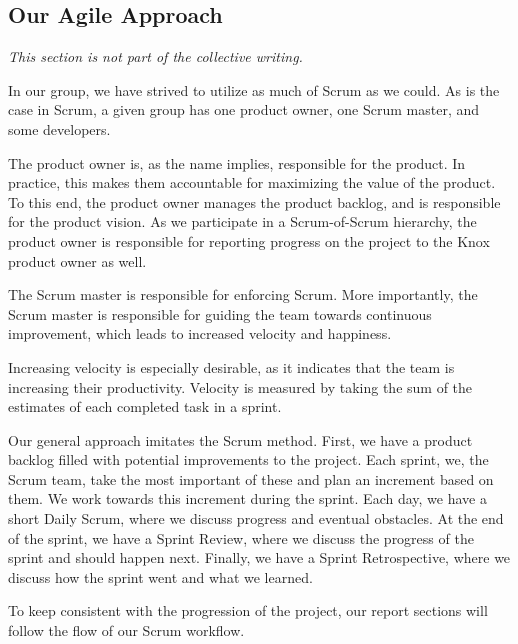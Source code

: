 \subsection{Our Agile Approach}\label{our_agile_approach}
\textit{This section is not part of the collective writing.}

In our group, we have strived to utilize as much of Scrum as we could.
As is the case in Scrum, a given group has one product owner, one Scrum master, and some developers.

The product owner is, as the name implies, responsible for the product. In practice, this makes them accountable for maximizing the value of the product. To this end, the product owner manages the product backlog, and is responsible for the product vision. As we participate in a Scrum-of-Scrum hierarchy, the product owner is responsible for reporting progress on the project to the Knox product owner as well.

The Scrum master is responsible for enforcing Scrum. More importantly, the Scrum master is responsible for guiding the team towards continuous improvement, which leads to increased velocity and happiness.

Increasing velocity is especially desirable, as it indicates that the team is increasing their productivity. Velocity is measured by taking the sum of the estimates of each completed task in a sprint\cite{sutherlandScrumArtDoing2014}. 

Our general approach imitates the Scrum method. First, we have a product backlog filled with potential improvements to the project. Each sprint, we, the Scrum team, take the most important of these and plan an increment based on them. We work towards this increment during the sprint. Each day, we have a short Daily Scrum, where we discuss progress and eventual obstacles. At the end of the sprint, we have a Sprint Review, where we discuss the progress of the sprint and should happen next. Finally, we have a Sprint Retrospective, where we discuss how the sprint went and what we learned.

To keep consistent with the progression of the project, our report sections will follow the flow of our Scrum workflow.